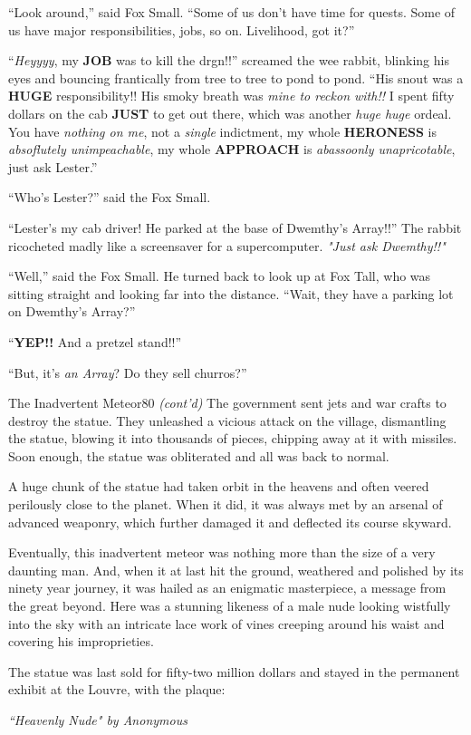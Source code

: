 \documentclass[12pt,twoside]{report}
\begin{document}
``Look around,'' said Fox Small.  ``Some of us don't have time for
        quests.  Some of us have major responsibilities, jobs, so on.
        Livelihood, got it?''

``{\em Heyyyy}, my {\bf JOB} was to kill the drgn!!'' screamed the wee
        rabbit, blinking his eyes and bouncing frantically from tree
        to tree to pond to pond.  ``His snout was a {\bf HUGE}
        responsibility!!  His smoky breath was {\em mine to reckon
          with!!} I spent fifty dollars on the cab {\bf JUST} to get
        out there, which was another {\em huge huge} ordeal.  You have
        {\em nothing on me}, not a {\em single} indictment, my whole
        {\bf HERONESS} is {\em absoflutely unimpeachable}, my whole
        {\bf APPROACH} is {\em abassoonly unapricotable}, just ask
        Lester.''

``Who's Lester?'' said the Fox Small.

``Lester's my cab driver!  He parked at the base of Dwemthy's
        Array!!''  The rabbit ricocheted madly like a screensaver for
        a supercomputer.  {\em "Just ask Dwemthy!!"}

``Well,'' said the Fox Small.  He turned back to look up at Fox Tall,
        who was sitting straight and looking far into the distance.
        ``Wait, they have a parking lot on Dwemthy's Array?''

``{\bf YEP!!}  And a pretzel stand!!''

``But, it's {\em an Array}?  Do they sell churros?''

	\begin{sidebar}{The Inadvertent Meteor}{80}
		\textit{(cont'd)} The government sent jets and war crafts to destroy the statue. They unleashed a vicious attack on the village, dismantling the statue, blowing it into thousands of pieces, chipping away at it with missiles. Soon enough, the statue was obliterated and all was back to normal.\vspace{6pt}
		
		A huge chunk of the statue had taken orbit in the heavens and often veered perilously close to the planet. When it did, it was always met by an arsenal of advanced weaponry, which further damaged it and deflected its course skyward.\vspace{6pt}

		Eventually, this inadvertent meteor was nothing more than the size of a very daunting man. And, when it at last hit the ground, weathered and polished by its ninety year journey, it was hailed as an enigmatic masterpiece, a message from the great beyond. Here was a stunning likeness of a male nude looking wistfully into the sky with an intricate lace work of vines creeping around his waist and covering his improprieties.\vspace{6pt}

		The statue was last sold for fifty-two million dollars and stayed in the permanent exhibit at the Louvre, with the plaque:\vspace{6pt}
		
		\indent \textit{``Heavenly Nude" by Anonymous}\vspace{6pt}
	\end{sidebar}
\end{document}
